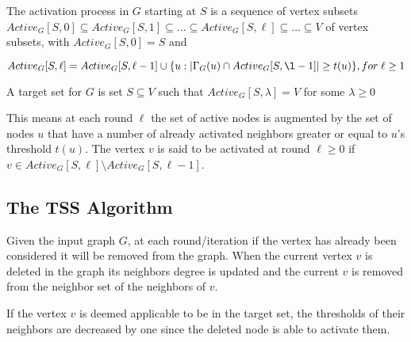 	The activation process in $G$ starting at $S$ is a sequence of vertex subsets $Active_{G}[S,0] \subseteq Active_{G}[S,1] \subseteq ... \subseteq Active_{G}[S,\ell] \subseteq ... \subseteq V$ of vertex subsets, with $Active_{G}[S,0]=S$ and 
	
	$Active_{G}[S,\ell]=Active_{G}[S,\ell-1] \cup \{u:|\Gamma_{G}(u)\cap Active_{G}[S,\l-1]|\geq t(u)\}, for \; \ell \geq 1$
	
	A target set for $G$ is set $S \subseteq V$ such that $Active_{G}[S,\lambda]=V$ for some $\lambda \geq 0$
	
	This means at each round $\ell$ the set of active nodes is augmented by the set of nodes $u$ that have a number of already activated neighbors greater or equal to $u$'s threshold $t(u)$. The vertex $v$ is said to be activated at round $\ell \ge 0$ if $v \in Active_{G}[S,\ell]\setminus Active_{G}[S,\ell-1]$.
	
	\subsection{The TSS Algorithm}
	
	Given the input graph $G$, at each round/iteration if the vertex has already been considered it will be removed from the graph. When the current vertex $v$ is deleted in the graph its neighbors degree is updated and the current $v$ is removed from the neighbor set of the neighbors of $v$.
	
	If the vertex $v$ is deemed applicable to be in the target set, the thresholds of their neighbors are decreased by one since the deleted node is able to activate them.
	
